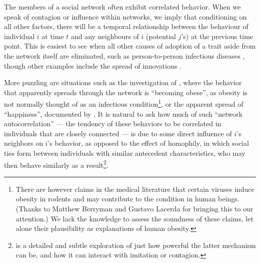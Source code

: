 \documentclass{article}
\begin{document}
\begin{multicols}{2}
The members of a social network often exhibit correlated behavior.  When we
speak of contagion or influence within networks, we imply that conditioning on
all other factors, there will be a temporal relationship between the behaviour
of individual $i$ at time $t$ and any neighbours of $i$ (potential $j$'s) at
the previous time point. This is easiest to see when all other causes of
adoption of a trait aside from the network itself are eliminated, such as
person-to-person infectious diseases
\citep{Bartlett-stochastic-population-models, Ellner-Guckenheimer,
  MEJN-epidemics-on-networks}, though other examples include the spread of
innovations \citep{Rogers-diffusion-of-innovations}.

More puzzling are situations such as the investigation of
\citet{Christakis-Fowler-spread-of-obesity}, where the behavior that apparently
spreads through the network is ``becoming obese'', as obesity is not normally
thought of as an infectious condition\footnote{There are however claims in the
  medical literature \citep{Atkinson-viruses-obesity} that certain viruses
  induce obesity in rodents and may contribute to the condition in human
  beings.  (Thanks to Matthew Berryman and Gustavo Lacerda for bringing this to
  our attention.)  We lack the knowledge to assess the soundness of these
  claims, let alone their plausibility as explanations of human obesity.}, or
the apparent spread of ``happiness'', documented by
\citet{Fowler-Christakis-happiness}.  It is natural to ask how much of such
``network autocorrelation'' --- the tendency of these behaviors to be
correlated in individuals that are closely connected --- is due to some direct
influence of $i$'s neighbors on $i$'s behavior, as opposed to the effect of
homophily, in which social ties form between individuals with similar
antecedent characteristics, who may then behave similarly as a
result\footnote{\citet[ch.\ 5]{Sperber-explaining} is a detailed and subtle
  exploration of just how powerful the latter mechanism can be, and how it can
  interact with imitation or contagion.}.


\end{multicols}
\end{document}
